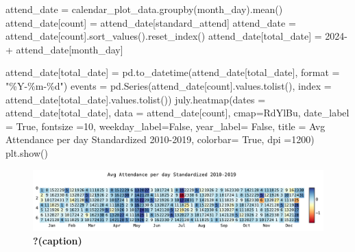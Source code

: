 \documentclass[
  letterpaper,
  DIV=11,
  numbers=noendperiod]{scrartcl}
\newenvironment{Shaded}{\begin{snugshade}}{\end{snugshade}}
\newcommand{\BuiltInTok}[1]{\textcolor[rgb]{0.00,0.23,0.31}{#1}}
\newcommand{\DecValTok}[1]{\textcolor[rgb]{0.68,0.00,0.00}{#1}}
\newcommand{\NormalTok}[1]{\textcolor[rgb]{0.00,0.23,0.31}{#1}}
\newcommand{\OperatorTok}[1]{\textcolor[rgb]{0.37,0.37,0.37}{#1}}
\newcommand{\SpecialCharTok}[1]{\textcolor[rgb]{0.37,0.37,0.37}{#1}}
\newcommand{\StringTok}[1]{\textcolor[rgb]{0.13,0.47,0.30}{#1}}
\newcommand{\VariableTok}[1]{\textcolor[rgb]{0.07,0.07,0.07}{#1}}
\begin{document}
\begin{Shaded}
\begin{Highlighting}[]
\NormalTok{attend\_date }\OperatorTok{=}\NormalTok{ calendar\_plot\_data.groupby(}\StringTok{\textquotesingle{}month\_day\textquotesingle{}}\NormalTok{).mean()}
\NormalTok{attend\_date[}\StringTok{\textquotesingle{}count\textquotesingle{}}\NormalTok{] }\OperatorTok{=}\NormalTok{ attend\_date[}\StringTok{\textquotesingle{}standard\_attend\textquotesingle{}}\NormalTok{]}
\NormalTok{attend\_date }\OperatorTok{=}\NormalTok{ attend\_date[}\StringTok{\textquotesingle{}count\textquotesingle{}}\NormalTok{].sort\_values().reset\_index()}
\NormalTok{attend\_date[}\StringTok{\textquotesingle{}total\_date\textquotesingle{}}\NormalTok{] }\OperatorTok{=} \StringTok{\textquotesingle{}2024{-}\textquotesingle{}} \OperatorTok{+}\NormalTok{ attend\_date[}\StringTok{\textquotesingle{}month\_day\textquotesingle{}}\NormalTok{]}

\NormalTok{attend\_date[}\StringTok{\textquotesingle{}total\_date\textquotesingle{}}\NormalTok{] }\OperatorTok{=}\NormalTok{ pd.to\_datetime(attend\_date[}\StringTok{\textquotesingle{}total\_date\textquotesingle{}}\NormalTok{], }\BuiltInTok{format} \OperatorTok{=} \StringTok{"\%Y{-}\%m{-}}\SpecialCharTok{\%d}\StringTok{"}\NormalTok{)}
\NormalTok{events }\OperatorTok{=}\NormalTok{ pd.Series(attend\_date[}\StringTok{\textquotesingle{}count\textquotesingle{}}\NormalTok{].values.tolist(), index }\OperatorTok{=}\NormalTok{ attend\_date[}\StringTok{\textquotesingle{}total\_date\textquotesingle{}}\NormalTok{].values.tolist())}
\NormalTok{july.heatmap(dates }\OperatorTok{=}\NormalTok{ attend\_date[}\StringTok{\textquotesingle{}total\_date\textquotesingle{}}\NormalTok{], data }\OperatorTok{=}\NormalTok{ attend\_date[}\StringTok{\textquotesingle{}count\textquotesingle{}}\NormalTok{],  cmap}\OperatorTok{=}\StringTok{\textquotesingle{}RdYlBu\textquotesingle{}}\NormalTok{, date\_label }\OperatorTok{=} \VariableTok{True}\NormalTok{, fontsize }\OperatorTok{=}\DecValTok{10}\NormalTok{, weekday\_label}\OperatorTok{=}\VariableTok{False}\NormalTok{, year\_label}\OperatorTok{=} \VariableTok{False}\NormalTok{, title }\OperatorTok{=} \StringTok{\textquotesingle{}Avg Attendance per day Standardized 2010{-}2019\textquotesingle{}}\NormalTok{, colorbar}\OperatorTok{=} \VariableTok{True}\NormalTok{, dpi }\OperatorTok{=}\DecValTok{1200}\NormalTok{)}
\NormalTok{plt.show()}
\end{Highlighting}
\end{Shaded}

\begin{figure}[H]

{\centering \includegraphics{Blog_post_files/figure-pdf/fig-cal_attend-output-1.pdf}

}

\caption{\label{fig-cal_attend}\textbf{?(caption)}}

\end{figure}
\end{document}
